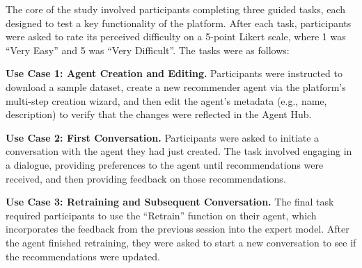 The core of the study involved participants completing three guided tasks, each designed to test a key functionality of the platform. After each task, participants were asked to rate its perceived difficulty on a 5-point Likert scale, where 1 was ``Very Easy'' and 5 was ``Very Difficult''. The tasks were as follows:

\begin{compactitem}[\textbullet]
    \item \textbf{Use Case 1: Agent Creation and Editing.} Participants were instructed to download a sample dataset, create a new recommender agent via the platform's multi-step creation wizard, and then edit the agent's metadata (e.g., name, description) to verify that the changes were reflected in the Agent Hub.
    \item \textbf{Use Case 2: First Conversation.} Participants were asked to initiate a conversation with the agent they had just created. The task involved engaging in a dialogue, providing preferences to the agent until recommendations were received, and then providing feedback on those recommendations.
    \item \textbf{Use Case 3: Retraining and Subsequent Conversation.} The final task required participants to use the ``Retrain'' function on their agent, which incorporates the feedback from the previous session into the expert model. After the agent finished retraining, they were asked to start a new conversation to see if the recommendations were updated.
\end{compactitem}